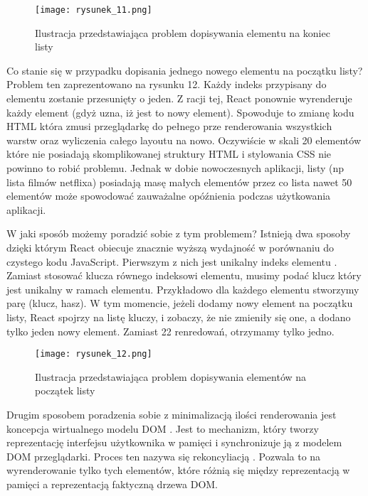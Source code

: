 \begin{figure}[!ht]
    \centering
    \texttt{[image: rysunek\_11.png]}
    \caption{Ilustracja przedstawiająca problem dopisywania elementu na koniec listy}
    \label{fig:rysunek_11}
\end{figure}

Co stanie się w przypadku dopisania jednego nowego elementu na początku listy? Problem ten zaprezentowano na rysunku 12. Każdy indeks przypisany do elementu zostanie przesunięty o jeden.
Z racji tej, React ponownie wyrenderuje każdy element (gdyż uzna, iż jest to nowy element). Spowoduje to zmianę kodu HTML która zmusi przeglądarkę do pełnego prze renderowania wszystkich warstw oraz wyliczenia całego layoutu na nowo.
Oczywiście w skali 20 elementów które nie posiadają skomplikowanej struktury HTML i stylowania CSS nie powinno to robić problemu.
Jednak w dobie nowoczesnych aplikacji, listy (np lista filmów netflixa) posiadają masę małych elementów przez co lista nawet 50 elementów może spowodować zauważalne opóźnienia podczas użytkowania aplikacji.

W jaki sposób możemy poradzić sobie z tym problemem? Istnieją dwa sposoby dzięki którym React obiecuje znacznie wyższą wydajność w porównaniu do czystego kodu JavaScript.
Pierwszym z nich jest unikalny indeks elementu \cite{react-lists}. Zamiast stosować klucza równego indeksowi elementu, musimy podać klucz który jest unikalny w ramach elementu.
Przykładowo dla każdego elementu stworzymy parę (klucz, hasz). W tym momencie, jeżeli dodamy nowy element na początku listy, React spojrzy na listę kluczy, i zobaczy, że nie zmieniły się one, a dodano tylko jeden nowy element.
Zamiast 22 renredowań, otrzymamy tylko jedno.

\begin{figure}[!ht]
    \centering
    \texttt{[image: rysunek\_12.png]}
    \caption{Ilustracja przedstawiająca problem dopisywania elementów na początek listy}
    \label{fig:rysunek_12}
\end{figure}

Drugim sposobem poradzenia sobie z minimalizacją ilości renderowania jest koncepcja wirtualnego modelu DOM \cite{virtualdom}.
Jest to mechanizm, który tworzy reprezentację interfejsu użytkownika w pamięci i synchronizuje ją z modelem DOM przeglądarki. Proces ten nazywa się rekoncyliacją \cite{reconcilation}.
Pozwala to na wyrenderowanie tylko tych elementów, które różnią się między reprezentacją w pamięci a reprezentacją faktyczną drzewa DOM.

